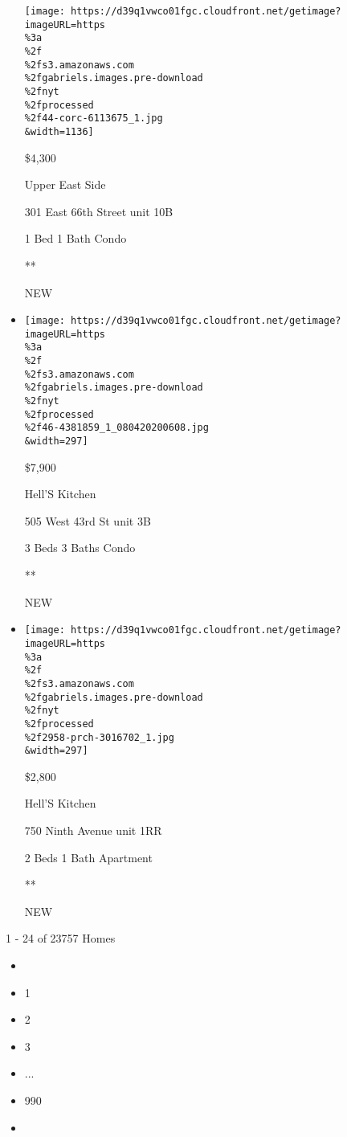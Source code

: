 \begin{itemize}
  \texttt{[image: https://d39q1vwco01fgc.cloudfront.net/getimage?imageURL=https\\\%3a\\\%2f\\\%2fs3.amazonaws.com\\\%2fgabriels.images.pre-download\\\%2fnyt\\\%2fprocessed\\\%2f44-corc-6113675\_1.jpg\\\&width=1136]}

  \$4,300

  Upper East Side

  301 East 66th Street unit 10B

  1 Bed \textbar{} 1 Bath \textbar{} Condo

  **

  NEW
\item
  \href{/real-estate/usa/ny/new-york/hells-kitchen/homes-for-rent/505-west-43rd-st/46-4381859?}{}

  \texttt{[image: https://d39q1vwco01fgc.cloudfront.net/getimage?imageURL=https\\\%3a\\\%2f\\\%2fs3.amazonaws.com\\\%2fgabriels.images.pre-download\\\%2fnyt\\\%2fprocessed\\\%2f46-4381859\_1\_080420200608.jpg\\\&width=297]}

  \$7,900

  Hell'S Kitchen

  505 West 43rd St unit 3B

  3 Beds \textbar{} 3 Baths \textbar{} Condo

  **

  NEW
\item
  \href{/real-estate/usa/ny/new-york/hells-kitchen/homes-for-rent/750-ninth-avenue/2958-PRCH-3016702?}{}

  \texttt{[image: https://d39q1vwco01fgc.cloudfront.net/getimage?imageURL=https\\\%3a\\\%2f\\\%2fs3.amazonaws.com\\\%2fgabriels.images.pre-download\\\%2fnyt\\\%2fprocessed\\\%2f2958-prch-3016702\_1.jpg\\\&width=297]}

  \$2,800

  Hell'S Kitchen

  750 Ninth Avenue unit 1RR

  2 Beds \textbar{} 1 Bath \textbar{} Apartment

  **

  NEW
\end{itemize}

1 - 24 of 23757 Homes

\begin{itemize}
\item
\item
  1
\item
  2
\item
  3
\item
  ...
\item
  990
\item
\end{itemize}

